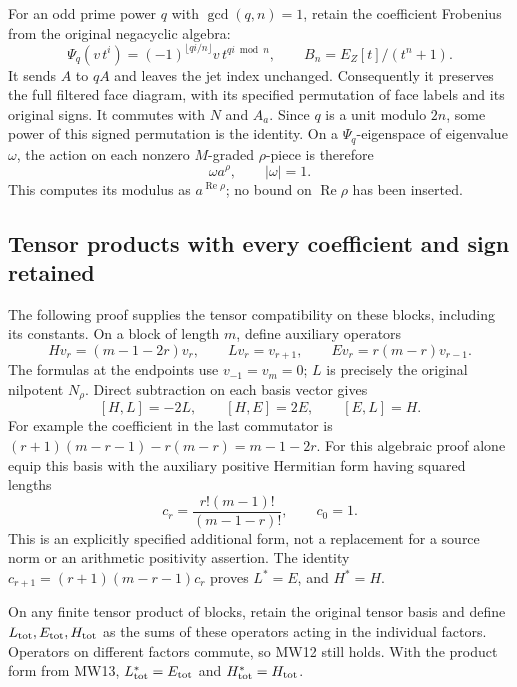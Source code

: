 For an odd prime power \(q\) with \(\gcd(q,n)=1\), retain the coefficient
Frobenius from the original negacyclic algebra:
\[
 \Psi_q(v\,t^i)
   =(-1)^{\lfloor qi/n\rfloor}v\,t^{qi\bmod n},
 \qquad B_n=E_Z[t]/(t^n+1).
 \tag{MW9}
\]
It sends \(A\) to \(qA\) and leaves the jet index unchanged.
Consequently it preserves the full filtered face diagram, with its
specified permutation of face labels and its original signs. It
commutes with \(N\) and \(A_a\). Since \(q\) is a unit modulo \(2n\),
some power of this signed permutation is the identity. On a
\(\Psi_q\)-eigenspace of eigenvalue \(\omega\), the action on each
nonzero \(M\)-graded \(\rho\)-piece is therefore
\[
       \omega a^\rho,\qquad |\omega|=1 .
 \tag{MW10}
\]
This computes its modulus as \(a^{\operatorname{Re}\rho}\); no bound
on \(\operatorname{Re}\rho\) has been inserted.

\subsection{Tensor products with every coefficient and sign retained}

The following proof supplies the tensor compatibility on these blocks,
including its constants. On a block of length \(m\), define auxiliary
operators
\[
 H v_r=(m-1-2r)v_r,\qquad
 L v_r=v_{r+1},\qquad
 E v_r=r(m-r)v_{r-1}.
 \tag{MW11}
\]
The formulas at the endpoints use \(v_{-1}=v_m=0\); \(L\) is precisely
the original nilpotent \(N_\rho\). Direct subtraction on each basis
vector gives
\[
 [H,L]=-2L,\qquad [H,E]=2E,\qquad [E,L]=H .
 \tag{MW12}
\]
For example the coefficient in the last commutator is
\((r+1)(m-r-1)-r(m-r)=m-1-2r\).
For this algebraic proof alone equip this basis with the auxiliary
positive Hermitian form having squared lengths
\[
 c_r=\frac{r!(m-1)!}{(m-1-r)!},\qquad c_0=1 .
 \tag{MW13}
\]
This is an explicitly specified additional form, not a replacement
for a source norm or an arithmetic positivity assertion.
The identity
\(c_{r+1}=(r+1)(m-r-1)c_r\) proves \(L^*=E\), and \(H^*=H\).

On any finite tensor product of blocks, retain the original tensor
basis and define \(L_{\rm tot},E_{\rm tot},H_{\rm tot}\) as the sums
of these operators acting in the individual factors. Operators on
different factors commute, so MW12 still holds. With the product
form from MW13, \(L_{\rm tot}^*=E_{\rm tot}\) and
\(H_{\rm tot}^*=H_{\rm tot}\).

